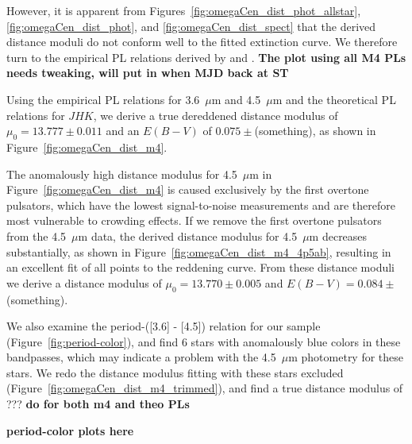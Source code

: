 \documentclass[a4paper,fleqn,usenatbib]{mnras}
\begin{document}
However, it is apparent from Figures~\ref{fig:omegaCen_dist_phot_allstar}, \ref{fig:omegaCen_dist_phot}, and \ref{fig:omegaCen_dist_spect} that the derived distance moduli do not conform well to the fitted extinction curve. We therefore turn to the empirical PL relations derived by \citet{2015arXiv150507858N} and \citet{2015ApJ...799..165B}. {\bf The plot using all M4 PLs needs tweaking, will put in when MJD back at ST}

Using the empirical PL relations for 3.6~$\mu$m and 4.5~$\mu$m and the theoretical PL relations for $J\!H\!K$, we derive a true dereddened distance modulus of $\mu_0 = 13.777 \pm 0.011$ and an $E(B-V)$ of $0.075 \pm $(something), as shown in Figure~\ref{fig:omegaCen_dist_m4}.

The anomalously high distance modulus for 4.5~$\mu$m in Figure~\ref{fig:omegaCen_dist_m4} is caused exclusively by the first overtone pulsators, which have the lowest signal-to-noise measurements and are therefore most vulnerable to crowding effects. If we remove the first overtone pulsators from the 4.5~$\mu$m data, the derived distance modulus for 4.5~$\mu$m decreases substantially, as shown in Figure~\ref{fig:omegaCen_dist_m4_4p5ab}, resulting in an excellent fit of all points to the reddening curve. From these distance moduli we derive a distance modulus of $\mu_0 = 13.770 \pm 0.005$ and $E(B-V) = 0.084 \pm$(something).

We also examine the period-([3.6] - [4.5]) relation for our sample (Figure~\ref{fig:period-color}), and find 6 stars with anomalously blue colors in these bandpasses, which may indicate a problem with the 4.5~$\mu$m photometry for these stars. We redo the distance modulus fitting with these stars excluded (Figure~\ref{fig:omegaCen_dist_m4_trimmed}), and find a true distance modulus of ??? {\bf do for both m4 and theo PLs}

{\bf period-color plots here}
\end{document}
